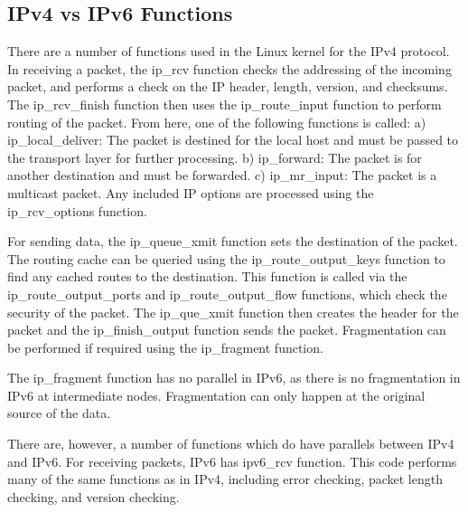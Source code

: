 \subsection{IPv4 vs IPv6 Functions}

There are a number of functions used in the Linux kernel for the IPv4 protocol.
In receiving a packet, the ip\_rcv function checks the addressing of the
incoming packet, and performs a check on the IP header, length, version, and
checksums. The ip\_rcv\_finish function then uses the ip\_route\_input function
to perform routing of the packet. From here, one of the following functions is
called: a) ip\_local\_deliver: The packet is destined for the local host and
must be passed to the transport layer for further processing. b) ip\_forward:
The packet is for another destination and must be forwarded. c) ip\_mr\_input:
The packet is a multicast packet. Any included IP options are processed using the
ip\_rcv\_options function\cite{khattak}.

For sending data, the ip\_queue\_xmit function sets the destination of the
packet. The routing cache can be queried using the ip\_route\_output\_keys
function to find any cached routes to the destination. This function is called
via the ip\_route\_output\_ports and ip\_route\_output\_flow functions, which
check the security of the packet. The ip\_que\_xmit function then creates the
header for the packet and the ip\_finish\_output function sends the packet.
Fragmentation can be performed if required using the ip\_fragment
function\cite{khattak}.

The ip\_fragment function has no parallel in IPv6, as there is no fragmentation
in IPv6 at intermediate nodes. Fragmentation can only happen at the original
source of the data\cite{guru99}.

There are, however, a number of functions which do have parallels between IPv4
and IPv6. For receiving packets, IPv6 has ipv6\_rcv function. This code performs
many of the same functions as in IPv4, including error checking, packet length
checking, and version checking\cite{collier_2020}.
